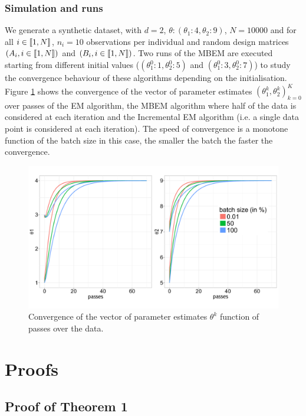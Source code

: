 \documentclass[11pt]{article}
\theoremstyle{plain}
\begin{document}
\subsubsection{Simulation and runs}
We generate a synthetic dataset, with $d = 2$, $\theta: (\theta_1:4,\theta_2:9)$, $N=10000$ and for all $i \in \llbracket1,N\rrbracket$, $n_i = 10$ observations per individual and random design matrices $(A_i, i \in \llbracket1,N\rrbracket)$ and $(B_i, i \in \llbracket1,N\rrbracket)$. Two runs of the MBEM are executed starting from different initial values ($(\theta_1^0:1,\theta_2^0:5)$ and $(\theta_1^0:3,\theta_2^0:7)$) to study the convergence behaviour of these algorithms depending on the initialisation.
Figure \ref{iem_glm} shows the convergence of the vector of parameter estimates $(\theta_1^k,\theta_2^k)_{k=0}^{K}$ over passes of the EM algorithm, the MBEM algorithm where half of the data is considered at each iteration and the Incremental EM algorithm (i.e. a single data point is considered at each iteration). The speed of convergence is a monotone function of the batch size in this case, the smaller the batch the faster the convergence.
\begin{figure}
\begin{center}
\includegraphics[scale = 0.35]{pics/iems.pdf}
\caption{Convergence of the vector of parameter estimates $\theta^k$ function of passes over the data.}
\label{iem_glm}
\end{center}
\end{figure}


\clearpage


\section{Proofs}\label{sec:proofs}

\subsection{Proof of Theorem 1}\label{proofs:IEM}
\end{document}
